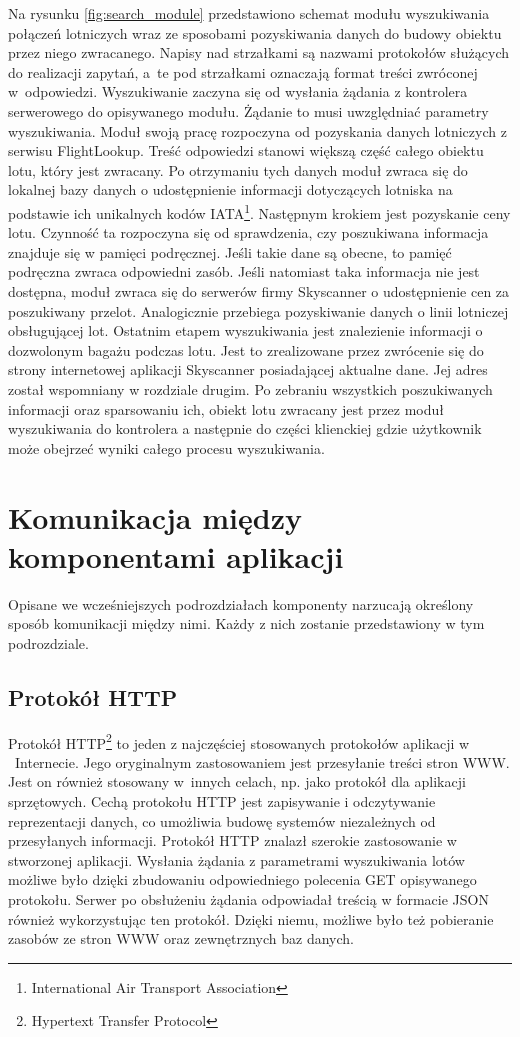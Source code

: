 \documentclass[12pt, twoside]{report}
\begin{document}
Na rysunku \ref{fig:search_module} przedstawiono schemat modułu wyszukiwania połączeń lotniczych wraz ze sposobami pozyskiwania danych do budowy obiektu przez niego zwracanego.
Napisy nad strzałkami są nazwami protokołów służących do realizacji zapytań, a~te pod strzałkami oznaczają format treści zwróconej w~odpowiedzi. Wyszukiwanie zaczyna się od wysłania żądania z kontrolera serwerowego do opisywanego modułu. Żądanie to musi uwzględniać  parametry wyszukiwania. Moduł swoją pracę rozpoczyna od pozyskania danych lotniczych z serwisu FlightLookup. Treść odpowiedzi stanowi większą część całego obiektu lotu, który jest zwracany. Po otrzymaniu tych danych moduł zwraca się do lokalnej bazy danych o udostępnienie informacji dotyczących lotniska na podstawie ich unikalnych kodów IATA\footnote{International Air Transport Association}. Następnym krokiem jest pozyskanie ceny lotu. Czynność ta rozpoczyna się od sprawdzenia, czy poszukiwana informacja znajduje się w pamięci podręcznej. Jeśli takie dane są obecne, to pamięć podręczna zwraca odpowiedni zasób. Jeśli natomiast taka informacja nie jest dostępna, moduł zwraca się do serwerów firmy Skyscanner o udostępnienie cen za poszukiwany przelot. Analogicznie przebiega pozyskiwanie danych o linii lotniczej obsługującej lot. Ostatnim etapem wyszukiwania jest znalezienie informacji o dozwolonym bagażu podczas lotu. Jest to zrealizowane przez zwrócenie się do strony internetowej aplikacji Skyscanner posiadającej aktualne dane. Jej adres został wspomniany w rozdziale drugim. Po zebraniu wszystkich poszukiwanych informacji oraz sparsowaniu ich, obiekt lotu zwracany jest przez moduł wyszukiwania do kontrolera a następnie do części klienckiej gdzie użytkownik może obejrzeć wyniki całego procesu wyszukiwania.

\section{Komunikacja między komponentami aplikacji}
Opisane we wcześniejszych podrozdziałach komponenty narzucają określony sposób komunikacji między nimi. Każdy z nich zostanie przedstawiony w tym podrozdziale.

\subsection{Protokół HTTP}
Protokół HTTP\footnote{Hypertext Transfer Protocol} to jeden z najczęściej stosowanych  protokołów aplikacji w ~Internecie. Jego oryginalnym zastosowaniem jest przesyłanie treści stron WWW. Jest on również stosowany w~innych celach, np. jako protokół dla aplikacji sprzętowych\cite{http}. Cechą protokołu HTTP jest zapisywanie i odczytywanie reprezentacji danych, co umożliwia budowę systemów niezależnych od przesyłanych informacji. Protokół HTTP znalazł szerokie zastosowanie w stworzonej aplikacji. Wysłania żądania z parametrami wyszukiwania lotów możliwe było dzięki zbudowaniu odpowiedniego polecenia GET opisywanego protokołu. Serwer po obsłużeniu żądania odpowiadał treścią w formacie JSON również wykorzystując ten protokół. Dzięki niemu, możliwe było też pobieranie zasobów ze stron WWW oraz zewnętrznych baz danych.
 
\end{document}
